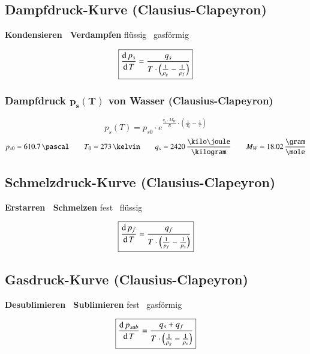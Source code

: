 \subsection{Dampfdruck-Kurve (Clausius-Clapeyron)}

\textbf{Kondensieren \textlrarrow\ Verdampfen}  \qquad flüssig \textlrarrow\ gasförmig

$$ \boxed{ \frac{\mathop{} \! \mathrm{d} \, p_s}{\mathop{} \! \mathrm{d} \, T} = \frac{q_s}{T \cdot  \Big( \frac{1}{\rho_g} - \frac{1}{\rho_f} \Big) } } $$


\subsubsection{Dampfdruck $\boldsymbol{p_s(T)}$ von Wasser (Clausius-Clapeyron)}

\vspace{-0.2cm}

$$ \boxed{ p_s(T) = p_{s0} \cdot e^{\frac{q_s \cdot M_W}{R} \cdot \left( \frac{1}{T_0} - \frac{1}{T} \right) }} $$
$$ p_{s0} = 610.7 \, \pascal \qquad T_0 = 273 \, \kelvin \qquad q_s = 2420 \, \frac{\kilo \joule}{\kilogram} \qquad M_W = 18.02 \, \frac{\gram}{\mole} $$

\subsection{Schmelzdruck-Kurve (Clausius-Clapeyron)}

\textbf{Erstarren \textlrarrow\ Schmelzen}  \qquad fest \textlrarrow\ flüssig

$$ \boxed{ \frac{\mathop{} \! \mathrm{d} \, p_f}{\mathop{} \! \mathrm{d} \, T} = \frac{q_f}{T \cdot \Big( \frac{1}{p_f} - \frac{1}{p_s} \Big) } } $$


\subsection{Gasdruck-Kurve (Clausius-Clapeyron)}

\textbf{Desublimieren \textlrarrow\ Sublimieren} \qquad fest \textleftarrow\ gasförmig

$$ \boxed{ \frac{\mathop{} \! \mathrm{d} \, p_{sub}}{\mathop{} \! \mathrm{d} \, T} = \frac{q_s + q_f}{T \cdot \Big( \frac{1}{\rho_g} - \frac{1}{\rho_s} \Big) } } $$


